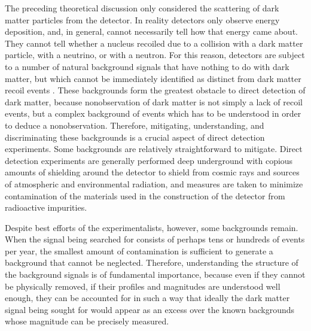 \documentclass[b5paper, 10pt, twoside]{book}
\begin{document}
The preceding theoretical discussion only considered the scattering of dark matter particles from the detector. In reality detectors only observe energy deposition, and, in general, cannot necessarily tell how that energy came about. They cannot tell whether a nucleus recoiled due to a collision with a dark matter particle, with a neutrino, or with a neutron. For this reason, detectors are subject to a number of natural background signals that have nothing to do with dark matter, but which cannot be immediately identified as distinct from dark matter recoil events \parencite{BaxterEtAl2022}. These backgrounds form the greatest obstacle to direct detection of dark matter, because nonobservation of dark matter is not simply a lack of recoil events, but a complex background of events which has to be understood in order to deduce a nonobservation. Therefore, mitigating, understanding, and discriminating these backgrounds is a crucial aspect of direct detection experiments. Some backgrounds are relatively straightforward to mitigate. Direct detection experiments are generally performed deep underground with copious amounts of shielding around the detector to shield from cosmic rays and sources of atmospheric and environmental radiation, and measures are taken to minimize contamination of the materials used in the construction of the detector from radioactive impurities.

Despite best efforts of the experimentalists, however, some backgrounds remain. When the signal being searched for consists of perhaps tens or hundreds of events per year, the smallest amount of contamination is sufficient to generate a background that cannot be neglected. Therefore, understanding the structure of the background signals is of fundamental importance, because even if they cannot be physically removed, if their profiles and magnitudes are understood well enough, they can be accounted for in such a way that ideally the dark matter signal being sought for would appear as an excess over the known backgrounds whose magnitude can be precisely measured.
\end{document}
